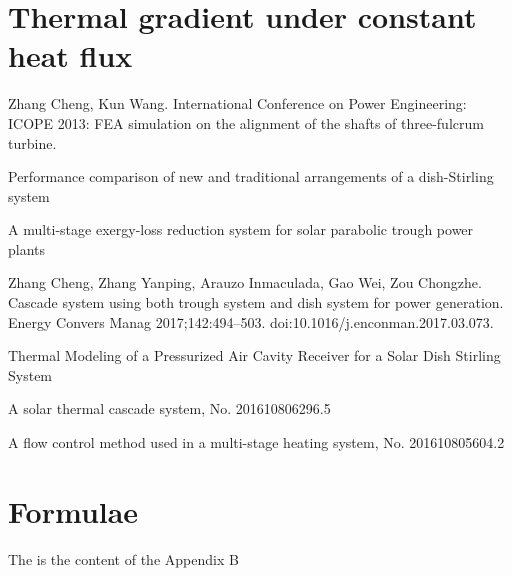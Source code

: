 \appendix

\chapter{Thermal gradient under constant heat flux}


\begin{publications}
  \item Zhang Cheng, Kun Wang. International Conference on Power Engineering: ICOPE 2013: FEA simulation on the alignment of the shafts of three-fulcrum turbine.
  \item Performance comparison of new and traditional arrangements of a dish-Stirling system
	\item A multi-stage exergy-loss reduction system for solar parabolic trough power plants
	\item Zhang Cheng, Zhang Yanping, Arauzo Inmaculada, Gao Wei, Zou Chongzhe. Cascade system using both trough system and dish system for power generation. Energy Convers Manag 2017;142:494–503. doi:10.1016/j.enconman.2017.03.073.
  \item Thermal Modeling of a Pressurized Air Cavity Receiver for a Solar Dish Stirling System
  \item A solar thermal cascade system, No. 201610806296.5
  \item A flow control method used in a multi-stage heating system, No. 201610805604.2
\end{publications}

\chapter{Formulae}\label{appendix:2}
  The is the content of the Appendix B